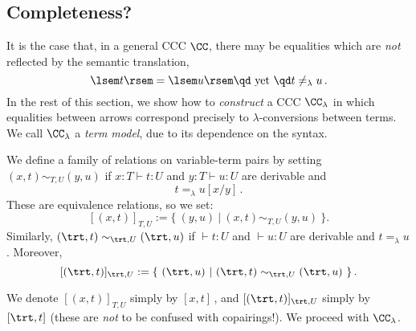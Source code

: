 \documentclass{svmult}
\begin{document}
\subsection{Completeness?}
It is the case that, in a general CCC $\CC$, there may be equalities which are \emph{not} reflected by the semantic translation, \ie
\[ \lsem t \rsem = \lsem u \rsem \text{\qd yet \qd} t\neq_\lambda u\,. \]
%
In the rest of this section,
we show how to \emph{construct} a CCC $\CC_\lambda$ in which equalities between arrows correspond precisely to $\lambda$-conversions between terms.
We call $\CC_\lambda$ a \emph{term model}, due to its dependence on the syntax.

\begin{mydefinition}\label{d:EqT}
We define a family of relations on variable-term pairs by setting \hbox{$(x,t)\sim_{T,U}(y,u)$} if $x:T\vdash t:U$ and $y:T\vdash u:U$ are derivable and
\[ t=_\lambda u[x/y]\,. \]
These are equivalence relations, so we set:
\[ [(x,t)]_{T,U} := \{\ (y,u)\ |\ (x,t)\sim_{T,U}(y,u)\ \}. \]
Similarly, $(\trt,t)\sim_{\trt,U}(\trt,u)$ if $\vdash t:U$ and $\vdash u:U$ are derivable and $t=_\lambda u$. Moreover,
\[ [(\trt,t)]_{\trt,U} := \{\ (\trt,u)\ |\ (\trt,t)\sim_{\trt,U}(\trt,u)\ \}\,. \]\deq[-1]
\end{mydefinition}
We denote $[(x,t)]_{T,U}$ simply by $[x,t]$\,, and $[(\trt,t)]_{\trt,U}$ simply by $[\trt,t]$ (these are \emph{not} to be confused with copairings!). We proceed with $\CC_\lambda$.
\end{document}
